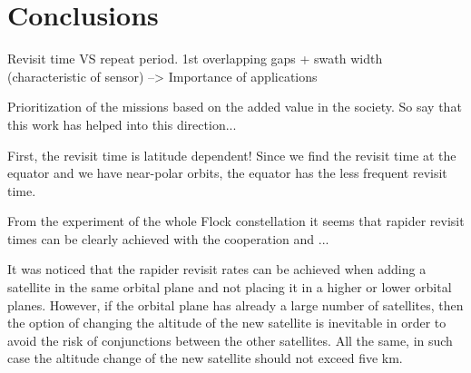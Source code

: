 \bigskip
\section{Conclusions}
\bigskip

Revisit time VS repeat period. 1st overlapping gaps + swath width (characteristic of sensor) --> Importance of applications

Prioritization of the missions based on the added value in the society. So say that this work has helped into this direction...


First, the revisit time is latitude dependent! Since we find the revisit time at the equator and we have near-polar orbits, the equator has the less frequent revisit time.

From the experiment of the whole Flock constellation it seems that rapider revisit times can be clearly achieved with the cooperation and ...


It was noticed that the rapider revisit rates can be achieved when adding a satellite in the same orbital plane and not placing it in a higher or lower orbital planes. However, if the orbital plane has already a large number of satellites, then the option of changing the altitude of the new satellite is inevitable in order to avoid the risk of conjunctions between the other satellites. All the same, in such case the altitude change of the new satellite should not exceed five km.